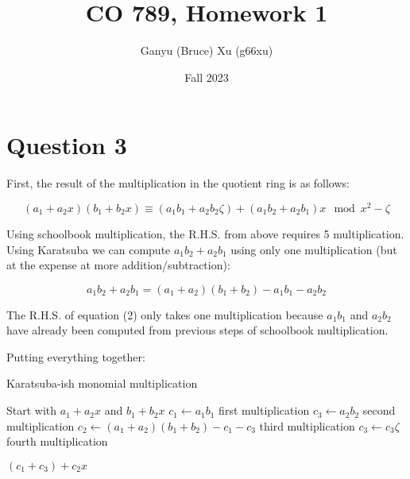 \documentclass{article}
\title{CO 789, Homework 1}
\author{Ganyu (Bruce) Xu (g66xu)}
\date{Fall 2023}
\begin{document}

\section*{Question 3}
First, the result of the multiplication in the quotient ring is as follows:

\begin{equation}
    (a_1 + a_2x)(b_1 + b_2x) \equiv (a_1b_1 + a_2b_2\zeta) + (a_1b_2 + a_2b_1)x \mod x^2 - \zeta
\end{equation}

Using schoolbook multiplication, the R.H.S. from above requires 5 multiplication. Using Karatsuba we can compute $a_1b_2 + a_2b_1$ using only one multiplication (but at the expense at more addition/subtraction):

\begin{equation}
    a_1b_2 + a_2b_1 = (a_1 + a_2)(b_1 + b_2) - a_1b_1 - a_2b_2
\end{equation}

The R.H.S. of equation (2) only takes one multiplication because $a_1b_1$ and $a_2b_2$ have already been computed from previous steps of schoolbook multiplication.

Putting everything together:

\begin{algorithm}
\caption{Karatsuba-ish monomial multiplication}\label{alg:cap}
\begin{algorithmic}
    
    \State Start with $a_1 + a_2x$ and $b_1 + b_2x$
    \State $c_1 \leftarrow a_1 b_1$ \Comment first multiplication
    \State $c_3 \leftarrow a_2b_2$ \Comment second multiplication
    \State $c_2 \leftarrow (a_1 + a_2)(b_1 + b_2) - c_1 - c_3$ \Comment third multiplication
    \State $c_3 \leftarrow c_3 \zeta$ \Comment fourth multiplication

\Return $(c_1 + c_3) + c_2x$

\end{algorithmic}
\end{algorithm}
\end{document}
